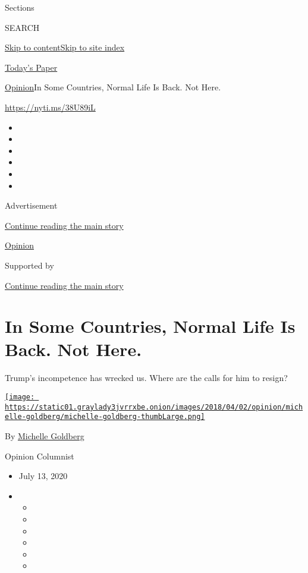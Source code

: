 Sections

SEARCH

\protect\hyperlink{site-content}{Skip to
content}\protect\hyperlink{site-index}{Skip to site index}

\href{https://myaccount.nytimes3xbfgragh.onion/auth/login?response_type=cookie\&client_id=vi}{}

\href{https://www.nytimes3xbfgragh.onion/section/todayspaper}{Today's
Paper}

\href{/section/opinion}{Opinion}\textbar{}In Some Countries, Normal Life
Is Back. Not Here.

\url{https://nyti.ms/38U89iL}

\begin{itemize}
\item
\item
\item
\item
\item
\item
\end{itemize}

Advertisement

\protect\hyperlink{after-top}{Continue reading the main story}

\href{/section/opinion}{Opinion}

Supported by

\protect\hyperlink{after-sponsor}{Continue reading the main story}

\hypertarget{in-some-countries-normal-life-is-back-not-here}{%
\section{In Some Countries, Normal Life Is Back. Not
Here.}\label{in-some-countries-normal-life-is-back-not-here}}

Trump's incompetence has wrecked us. Where are the calls for him to
resign?

\href{https://www.nytimes3xbfgragh.onion/by/michelle-goldberg}{\texttt{[image: https://static01.graylady3jvrrxbe.onion/images/2018/04/02/opinion/michelle-goldberg/michelle-goldberg-thumbLarge.png]}}

By
\href{https://www.nytimes3xbfgragh.onion/by/michelle-goldberg}{Michelle
Goldberg}

Opinion Columnist

\begin{itemize}
\item
  July 13, 2020
\item
  \begin{itemize}
  \item
  \item
  \item
  \item
  \item
  \item
  \end{itemize}
\end{itemize}


